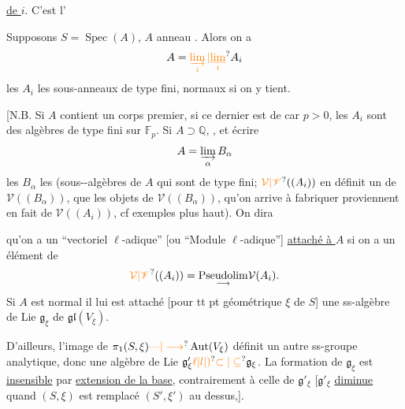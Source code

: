\uline{de $i$}.  C'est l'

Supposons $S=\operatorname{Spec}(A)$, $A$ anneau   . Alors on a
\[
A=\unsure{\varinjlim_i|\underset{i}{\underline{\lim}}}A_i
\]
les $A_i$ les sous-anneaux de type fini,  normaux  si on y tient.

[N.B.  Si $A$ contient un corps premier, si ce dernier est de car $p>0$, les $A_i$ sont des algèbres de type fini sur $\mathbb F_p$. Si $A\supset\mathbb Q$,  , et écrire
\[
A=\varinjlim_\alpha B_\alpha
\]
les $B_\alpha$ les (sous--algèbres de $A$ qui sont de type fini;   $\unsure{\mathcal V|\mathscr V}((A_i))$ en définit un de $\mathcal V((B_\alpha))$,  que les objets  de $\mathcal V((B_\alpha))$, qu'on arrive à fabriquer proviennent en fait de $\mathcal V((A_i))$, cf exemples plus haut). On dira

qu'on a un  ``vectoriel $\ell$-adique'' [ou ``Module $\ell$-adique''] \uline{attaché à $A$} si on a un élément de
\[
\unsure{\mathcal V|\mathscr V}((A_i))=\underset{\longrightarrow}{\operatorname{Pseudolim}}\mathcal V(A_i).
\]
Si $A$ est normal  il lui est attaché   [pour tt pt géométrique $\xi$ de $S$] une ss-algèbre de Lie $\mathfrak g_\xi$ de $\mathfrak{gl}(V_\xi)$.

D'ailleurs, l'image de $\pi_1(S,\xi)\unsure{\text{---}|\longrightarrow}\operatorname{Aut}(V_\xi)$ définit un autre ss-groupe analytique, donc une algèbre de Lie $\mathfrak g'_\xi\unsure{\ell|l|)}\unsure{\subset|\subseteq}\mathfrak g_\xi$. La formation de $\mathfrak g_\xi$ est  \uline{insensible} par \uline{extension  de la base}, contrairement à celle de $\mathfrak g'_\xi$ [$\mathfrak g'_\xi$ \uline{diminue} quand $(S,\xi)$ est remplacé  $(S',\xi')$ au dessus,].

